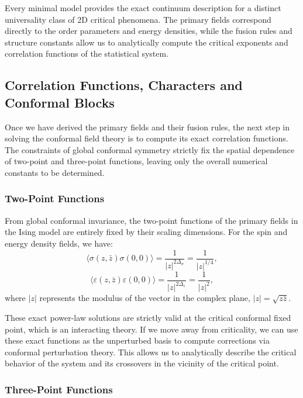 Every minimal model provides the exact continuum description for a distinct universality class of 2D critical phenomena. The primary fields correspond directly to the order parameters and energy densities, while the fusion rules and structure constants allow us to analytically compute the critical exponents and correlation functions of the statistical system.

\subsection{Correlation Functions, Characters and Conformal Blocks}

Once we have derived the primary fields and their fusion rules, the next step in solving the conformal field theory is to compute its exact correlation functions. The constraints of global conformal symmetry strictly fix the spatial dependence of two-point and three-point functions, leaving only the overall numerical constants to be determined.

\subsubsection{Two-Point Functions}

From global conformal invariance, the two-point functions of the primary fields in the Ising model are entirely fixed by their scaling dimensions. For the spin and energy density fields, we have:
\[
    \langle \sigma(z, \bar{z}) \sigma(0, 0) \rangle = \frac{1}{|z|^{2\Delta_\sigma}} = \frac{1}{|z|^{1/4}},
\]
\[
    \langle \varepsilon(z, \bar{z}) \varepsilon(0, 0) \rangle = \frac{1}{|z|^{2\Delta_\varepsilon}} = \frac{1}{|z|^{2}},
\]
where \(|z|\) represents the modulus of the vector in the complex plane, \(|z| = \sqrt{z\bar{z}}\).

\begin{remark}
    These exact power-law solutions are strictly valid at the critical conformal fixed point, which is an interacting theory. If we move away from criticality, we can use these exact functions as the unperturbed basis to compute corrections via conformal perturbation theory. This allows us to analytically describe the critical behavior of the system and its crossovers in the vicinity of the critical point.
\end{remark}

\subsubsection{Three-Point Functions}

